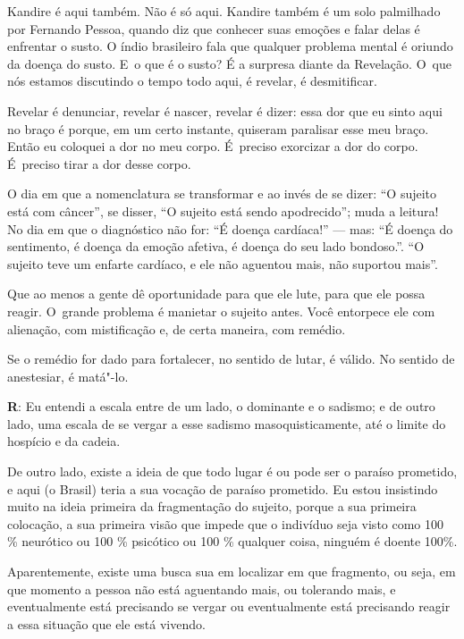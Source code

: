  

Kandire é aqui também. Não é só aqui. Kandire também é um solo
palmilhado por Fernando Pessoa, quando diz que conhecer suas emoções e
falar delas é enfrentar o susto. O índio brasileiro fala que qualquer
problema mental é oriundo da doença do susto. E~o que é o susto? É a
surpresa diante da Revelação. O~que nós estamos discutindo o tempo todo
aqui, é revelar, é desmitificar.

 

Revelar é denunciar, revelar é nascer, revelar é dizer: essa dor que eu
sinto aqui no braço é porque, em um certo instante, quiseram paralisar
esse meu braço. Então eu coloquei a dor no meu corpo. É~preciso
exorcizar a dor do corpo. É~preciso tirar a dor desse corpo.

 

O dia em que a nomenclatura se transformar e ao invés de se dizer: ``O
sujeito está com câncer'', se disser, ``O sujeito está sendo
apodrecido''; muda a leitura! No dia em que o diagnóstico não for: ``É
doença cardíaca!'' --- mas: ``É doença do sentimento, é doença da emoção
afetiva, é doença do seu lado bondoso.''. ``O sujeito teve um enfarte
cardíaco, e ele não aguentou mais, não suportou mais''.

Que ao menos a gente dê oportunidade para que ele lute, para que ele
possa reagir. O~grande problema é manietar o sujeito antes. Você
entorpece ele com alienação, com mistificação e, de certa maneira, com
remédio.

 

Se o remédio for dado para fortalecer, no sentido de lutar, é válido. No
sentido de anestesiar, é matá"-lo.

 

\textbf{R}: Eu entendi a escala entre de um lado, o dominante e o
sadismo; e de outro lado, uma escala de se vergar a esse sadismo
masoquisticamente, até o limite do hospício e da cadeia.

 

De outro lado, existe a ideia de que todo lugar é ou pode ser o paraíso
prometido, e aqui (o Brasil) teria a sua vocação de paraíso prometido.
Eu estou insistindo muito na ideia primeira da fragmentação do
sujeito, porque a sua primeira colocação, a sua primeira visão que
impede que o indivíduo seja visto como 100 \% neurótico ou 100 \%
psicótico ou 100 \% qualquer coisa, ninguém é doente 100\%.

 

Aparentemente, existe uma busca sua em localizar em que fragmento, ou
seja, em que momento a pessoa não está aguentando mais, ou tolerando
mais, e eventualmente está precisando se vergar ou eventualmente está
precisando reagir a essa situação que ele está vivendo.

